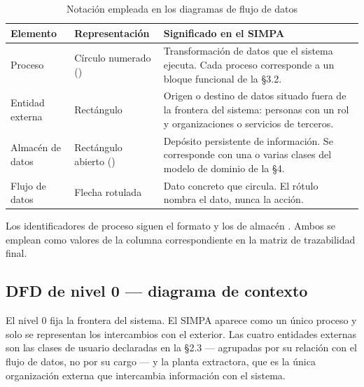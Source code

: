\begin{table}[H]
\centering\footnotesize
\caption{Notación empleada en los diagramas de flujo de datos}
\label{tab:notacion-dfd}
\begin{tabular}{|L{3.2cm}|L{3.4cm}|L{8.4cm}|}
\hline
{}\textbf{Elemento} & \textbf{Representación} & \textbf{Significado en el SIMPA}\\ \hline
Proceso & Círculo numerado () & Transformación de datos que el sistema ejecuta. Cada proceso corresponde a un bloque funcional de la §3.2.\\ \hline
Entidad externa & Rectángulo & Origen o destino de datos situado fuera de la frontera del sistema: personas con un rol y organizaciones o servicios de terceros.\\ \hline
Almacén de datos & Rectángulo abierto () & Depósito persistente de información. Se corresponde con una o varias clases del modelo de dominio de la §4.\\ \hline
Flujo de datos & Flecha rotulada & Dato concreto que circula. El rótulo nombra el dato, nunca la acción.\\ \hline
\end{tabular}
\end{table}

\noindent
Los identificadores de proceso siguen el formato  y los de almacén . Ambos se
emplean como valores de la columna correspondiente en la matriz de trazabilidad final.

\subsection{DFD de nivel 0 --- diagrama de contexto}

El nivel 0 fija la frontera del sistema. El SIMPA aparece como un único proceso y solo se representan
los intercambios con el exterior. Las cuatro entidades externas son las clases de usuario declaradas
en la §2.3 --- agrupadas por su relación con el flujo de datos, no por su cargo --- y la planta
extractora, que es la única organización externa que intercambia información con el sistema.

